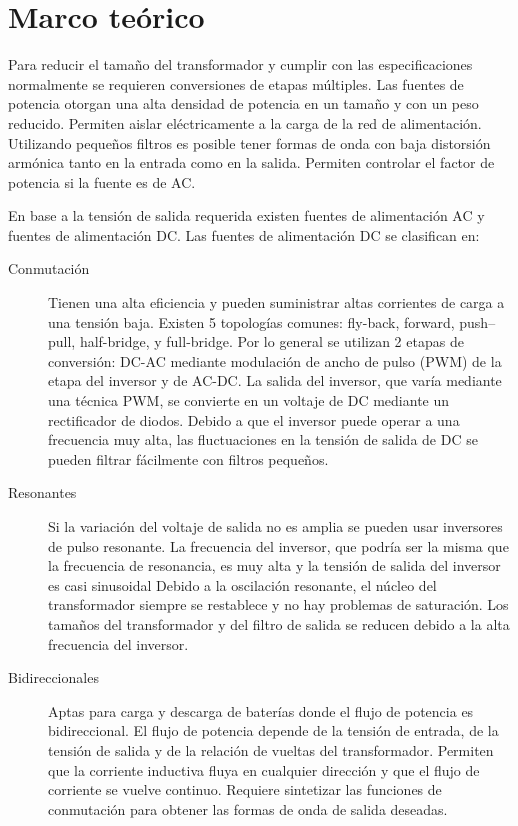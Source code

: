 \section{Marco teórico}

Para reducir el tamaño del transformador y cumplir con las especificaciones normalmente se requieren conversiones de etapas múltiples.
Las fuentes de potencia otorgan una alta densidad de potencia en un tamaño y con un peso reducido.  
Permiten aislar eléctricamente a la carga de la red de alimentación. 
Utilizando pequeños filtros es posible tener formas de onda con baja distorsión armónica tanto en la entrada como en la salida. 
Permiten controlar el factor de potencia si la fuente es de AC. %

En base a la tensión de salida requerida existen fuentes de alimentación AC y fuentes de alimentación DC.
Las fuentes de alimentación DC se clasifican en:
\begin{description}
    \item[Conmutación]
    Tienen una alta eficiencia y pueden suministrar altas corrientes de carga a una tensión baja.
    Existen 5 topologías comunes: fly-back, forward, push–pull, half-bridge, y full-bridge.
    Por lo general se utilizan 2 etapas de conversión: DC-AC mediante modulación de ancho de pulso (PWM) de la etapa del inversor y de AC-DC.
    La salida del inversor, que varía mediante una técnica PWM, se convierte en un voltaje de DC mediante un rectificador de diodos. 
    Debido a que el inversor puede operar a una frecuencia muy alta, las fluctuaciones en la tensión de salida de DC se pueden filtrar fácilmente con filtros pequeños.
    \item[Resonantes]
    Si la variación del voltaje de salida no es amplia se pueden usar inversores de pulso resonante. 
    La frecuencia del inversor, que podría ser la misma que la frecuencia de resonancia, es muy alta y la tensión de salida del inversor es casi sinusoidal 
    Debido a la oscilación resonante, el núcleo del transformador siempre se restablece y no hay problemas de saturación. 
    Los tamaños del transformador y del filtro de salida se reducen debido a la alta frecuencia del inversor.
    \item[Bidireccionales]
    Aptas para carga y descarga de baterías donde el flujo de potencia es bidireccional. 
    El flujo de potencia depende de la tensión de entrada, de la tensión de salida y de la relación de vueltas del transformador. 
    Permiten que la corriente inductiva fluya en cualquier dirección y que el flujo de corriente se vuelve continuo.
    Requiere sintetizar las funciones de conmutación para obtener las formas de onda de salida deseadas.
\end{description}

